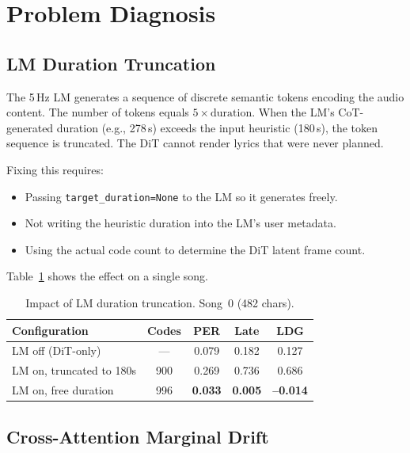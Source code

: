 \documentclass[11pt,a4paper]{article}
\begin{document}
\section{Problem Diagnosis}
\label{sec:diagnosis}

\subsection{LM Duration Truncation}
\label{sec:diag_dur}

The 5\,Hz LM generates a sequence of discrete semantic tokens encoding the audio content. The number of tokens equals $5 \times \text{duration}$. When the LM's CoT-generated duration (e.g., 278\,s) exceeds the input heuristic (180\,s), the token sequence is truncated. The DiT cannot render lyrics that were never planned.

Fixing this requires:
\begin{itemize}
    \item Passing \texttt{target\_duration=None} to the LM so it generates freely.
    \item Not writing the heuristic duration into the LM's user metadata.
    \item Using the actual code count to determine the DiT latent frame count.
\end{itemize}

Table~\ref{tab:trunc} shows the effect on a single song.

\begin{table}[h]
\centering
\caption{Impact of LM duration truncation. Song~0 (482 chars).}
\label{tab:trunc}
\begin{tabular}{lcccc}
\toprule
Configuration & Codes & PER & Late & LDG \\
\midrule
LM off (DiT-only) & --- & 0.079 & 0.182 & 0.127 \\
LM on, truncated to 180s & 900 & 0.269 & 0.736 & 0.686 \\
LM on, free duration & 996 & \textbf{0.033} & \textbf{0.005} & \textbf{--0.014} \\
\bottomrule
\end{tabular}
\end{table}

\subsection{Cross-Attention Marginal Drift}
\label{sec:diag_attn}
\end{document}
